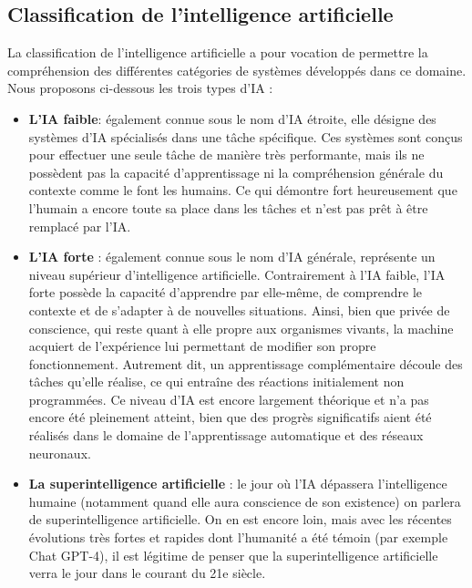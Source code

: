 \subsection{Classification de l’intelligence artificielle}

La classification de l’intelligence artificielle a pour vocation de permettre la compréhension des différentes catégories de systèmes développés dans ce domaine. Nous proposons ci-dessous les trois types d'IA :
\begin{itemize}  
	\item[\ding{118}]\textbf{L’IA faible}: également connue sous le nom d’IA étroite, elle désigne des systèmes d’IA spécialisés dans une tâche spécifique. Ces systèmes sont conçus pour effectuer une seule tâche de manière très performante, mais ils ne possèdent pas la capacité d’apprentissage ni la compréhension générale du contexte comme le font les humains. Ce qui démontre fort heureusement que l’humain a encore toute sa place dans les tâches et n’est pas prêt à être remplacé par l’IA.
	 
	\item[\ding{118}] \textbf{L’IA forte } : également connue sous le nom d’IA générale, représente un niveau supérieur d’intelligence artificielle. Contrairement à l’IA faible, l’IA forte possède la capacité d’apprendre par elle-même, de comprendre le contexte et de s’adapter à de nouvelles situations. Ainsi, bien que privée de conscience, qui reste quant à elle propre aux organismes vivants, la machine acquiert de l’expérience lui permettant de modifier son propre fonctionnement. Autrement dit, un apprentissage complémentaire découle des tâches qu’elle réalise, ce qui entraîne des réactions initialement non programmées. Ce niveau d’IA est encore largement théorique et n’a pas encore été pleinement atteint, bien que des progrès significatifs aient été réalisés dans le domaine de l’apprentissage automatique et des réseaux neuronaux.
	
	\item[\ding{118}] \textbf{La superintelligence artificielle} : le jour où l’IA dépassera l’intelligence humaine (notamment quand elle aura conscience de son existence) on parlera de superintelligence artificielle. On en est encore loin, mais avec les récentes évolutions très fortes et rapides dont l’humanité a été témoin (par exemple Chat GPT-4), il est légitime de penser que la superintelligence artificielle verra le jour dans le courant du 21e siècle. 
\end{itemize} 


